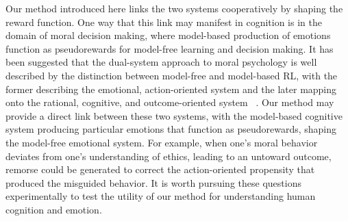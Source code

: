 \documentclass[letterpaper]{article}
\begin{document}
Our method introduced here links the two systems cooperatively by shaping the reward function. One way that this link may manifest in cognition is in the domain of moral decision making, where model-based production of emotions function as pseudorewards for model-free learning and decision making. It has been suggested that the dual-system approach to moral psychology is well described by the distinction between model-free and model-based RL, with the former describing the emotional, action-oriented system and the later mapping onto the rational, cognitive, and outcome-oriented system ~\cite{cushman2013action, crockett2013models}. Our method may provide a direct link between these two systems, with the model-based cognitive system producing particular emotions that function as pseudorewards, shaping the model-free emotional system. For example, when one's moral behavior deviates from one's understanding of ethics, leading to an untoward outcome, remorse could be generated to correct the action-oriented propensity that produced the misguided behavior. It is worth pursuing these questions experimentally to test the utility of our method for understanding human cognition and emotion.

{}

\end{document}

